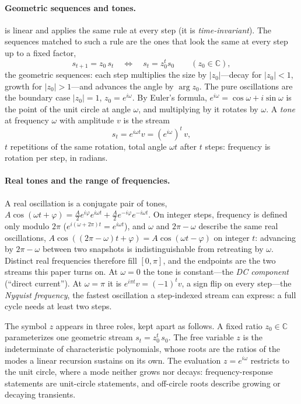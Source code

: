 \documentclass[11pt,a4paper]{article}
\theoremstyle{remark}
\begin{document}
\paragraph{Geometric sequences and tones.}  is linear and applies the same rule at every step (it is \emph{time-invariant}).
The sequences matched to such a rule are the ones that look the same at every step up to a fixed factor,
\[
s_{t+1}=z_0\,s_t\quad\Longleftrightarrow\quad s_t=z_0^{t}s_0\qquad(z_0\in\mathbb{C}),
\]
the geometric sequences: each step multiplies the size by $\lvert z_0\rvert$---decay for $\lvert z_0\rvert<1$, growth for $\lvert z_0\rvert>1$---and advances the angle by $\arg z_0$.
The pure oscillations are the boundary case $\lvert z_0\rvert=1$, $z_0=e^{i\omega}$.
By Euler's formula, $e^{i\omega}=\cos\omega+i\sin\omega$ is the point of the unit circle at angle $\omega$, and multiplying by it rotates by $\omega$.
A \emph{tone} at frequency $\omega$ with amplitude $v$ is the stream
\[
s_t=e^{i\omega t}v=(e^{i\omega})^{t}\,v,
\]
$t$ repetitions of the same rotation, total angle $\omega t$ after $t$ steps: frequency is rotation per step, in radians.

\paragraph{Real tones and the range of frequencies.} A real oscillation is a conjugate pair of tones, $A\cos(\omega t+\varphi)=\tfrac{A}{2}e^{i\varphi}e^{i\omega t}+\tfrac{A}{2}e^{-i\varphi}e^{-i\omega t}$.
On integer steps, frequency is defined only modulo $2\pi$ ($e^{i(\omega+2\pi)t}=e^{i\omega t}$), and $\omega$ and $2\pi-\omega$ describe the same real oscillations, $A\cos((2\pi-\omega)t+\varphi)=A\cos(\omega t-\varphi)$ on integer $t$: advancing by $2\pi-\omega$ between two snapshots is indistinguishable from retreating by $\omega$.
Distinct real frequencies therefore fill $[0,\pi]$, and the endpoints are the two streams this paper turns on.
At $\omega=0$ the tone is constant---the \emph{DC component} (``direct current'').
At $\omega=\pi$ it is $e^{i\pi t}v=(-1)^{t}v$, a sign flip on every step---the \emph{Nyquist frequency}, the fastest oscillation a step-indexed stream can express: a full cycle needs at least two steps.

The symbol $z$ appears in three roles, kept apart as follows.
A fixed ratio $z_0\in\mathbb{C}$ parameterizes one geometric stream $s_t=z_0^t\,s_0$.
The free variable $z$ is the indeterminate of characteristic polynomials, whose roots are the ratios of the modes a linear recursion sustains on its own.
The evaluation $z=e^{i\omega}$ restricts to the unit circle, where a mode neither grows nor decays: frequency-response statements are unit-circle statements, and off-circle roots describe growing or decaying transients.
\end{document}
